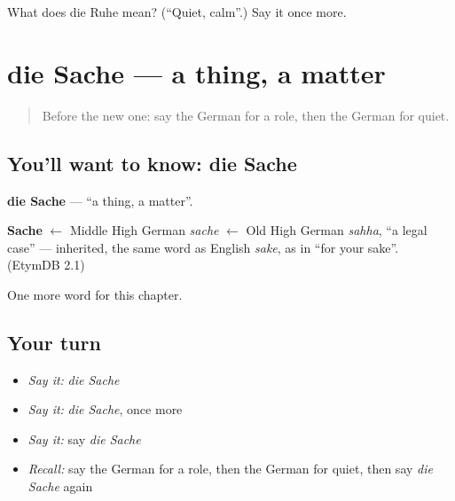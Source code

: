 \begin{tcolorbox}[breakable,colback=teal!4,colframe=teal!35!black,title={Before you move on}]
What does die Ruhe mean? (\textquotedblleft{}Quiet, calm\textquotedblright{}.) Say it once more.
\end{tcolorbox}
\section[die Sache]{die Sache — a thing, a matter}

\label{lesson:GE-C237-sache}



\begin{quote}
Before the new one: say the German for a role, then the German for quiet.
\end{quote}

\subsection*{You'll want to know: die Sache}
\textbf{die Sache} — \textquotedblleft{}a thing, a matter\textquotedblright{}.

\begin{cousinweb}
\textbf{Sache} $\leftarrow$ Middle High German \emph{sache} $\leftarrow$ Old High German \emph{sahha}, \textquotedblleft{}a legal case\textquotedblright{} — inherited, the same word as English \emph{sake}, as in \textquotedblleft{}for your sake\textquotedblright{}. (EtymDB 2.1)
\end{cousinweb}

\begin{grammarlens}[title={What you've built}]
One more word for this chapter.
\end{grammarlens}

\subsection*{Your turn}
\begin{itemize}
\raggedright
  \item \emph{Say it:} \emph{die Sache}
  \item \emph{Say it:} \emph{die Sache}, once more
  \item \emph{Say it:} say \emph{die Sache}
  \item \emph{Recall:} say the German for a role, then the German for quiet, then say \emph{die Sache} again
\end{itemize}

